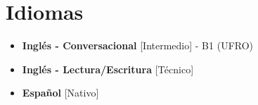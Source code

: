 \documentclass[11pt,a4paper,sans]{moderncv}
\newcommand{\sectionMargin}{-3mm}
\begin{document}
\vspace*{\sectionMargin}

\section{Idiomas}{
    \begin{multicols}{2}
        \begin{itemize}[label=\textbullet, itemsep=0mm]
            \item \textbf{Inglés - Conversacional} [Intermedio] - B1 (UFRO)
            \item \textbf{Inglés - Lectura/Escritura} [Técnico]
            \item \textbf{Español} [Nativo]
        \end{itemize}
    \end{multicols}
}
\end{document}
